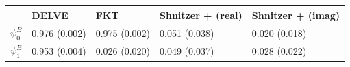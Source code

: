 \begin{tabular}{lllll}
\toprule
 & DELVE & FKT & Shnitzer + (real) & Shnitzer + (imag) \\
\midrule
$\psi^B_0$ & 0.976 (0.002) & 0.975 (0.002) & 0.051 (0.038) & 0.020 (0.018) \\
$\psi^B_1$ & 0.953 (0.004) & 0.026 (0.020) & 0.049 (0.037) & 0.028 (0.022) \\
\bottomrule
\end{tabular}
